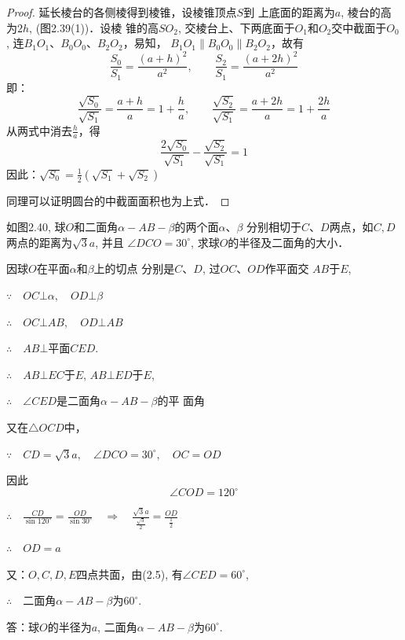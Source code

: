 \begin{proof}
    延长棱台的各侧棱得到棱锥，设棱锥顶点$S$到
    上底面的距离为$a$, 棱台的高为$2h$, (图2.39(1))．设棱
    锥的高$SO_2$, 交棱台上、下两底面于$O_1$和$O_2$交中截面于$O_0$,
    连$B_1O_1$、$B_0O_0$、$B_2O_2$，易知，
$B_1O_1\parallel B_0O_0\parallel B_2O_2$，故有
\[\frac{S_0}{S_1}=\frac{(a+h)^2}{a^2},\qquad \frac{S_2}{S_1}=\frac{(a+2h)^2}{a^2}\]
即：
\[\frac{\sqrt{S_0}}{\sqrt{S_1}}=\frac{a+h}{a}=1+\frac{h}{a},\qquad \frac{\sqrt{S_2}}{\sqrt{S_1}}=\frac{a+2h}{a}=1+\frac{2h}{a}\]
从两式中消去$\frac{h}{a}$，得
\[\frac{2\sqrt{S_0}}{\sqrt{S_1}}-\frac{\sqrt{S_2}}{\sqrt{S_1}}=1\]
因此：$\sqrt{S_0}=\frac{1}{2}\left(\sqrt{S_1}+\sqrt{S_2}\right)$

同理可以证明圆台的中截面面积也为上式．
\end{proof}


\begin{example}
    如图2.40, 球$O$和二面角$\alpha-AB-\beta$的两个面$\alpha$、$\beta$
分别相切于$C$、$D$两点，如$C,D$两点的距离为$\sqrt{3}a$, 并且
$\angle DCO=30^{\circ}$, 求球$O$的半径及二面角的大小．
\end{example}

\begin{solution}
    因球$O$在平面$\alpha$和$\beta$上的切点
分别是$C$、$D$, 过$OC$、$OD$作平面交
$AB$于$E$,

$\because\quad OC\bot\alpha,\quad OD\bot\beta$

$\therefore\quad OC\bot AB,\quad OD\bot AB$

$\therefore\quad AB\bot$平面$CED$.

$\therefore\quad AB\bot EC$于$E$, $AB\bot ED$于$E$,

$\therefore\quad \angle CED$是二面角$\alpha-AB-\beta$的平
面角

又在$\triangle OCD$中，

$\because\quad CD=\sqrt{3}a,\quad \angle DCO=30^{\circ},\quad 
OC=OD$

因此
\begin{equation}
    \angle COD=120^{\circ}
\end{equation}

$\therefore\quad \frac{CD}{\sin120^{\circ}}=\frac{OD}{\sin30^{\circ}}\quad \Rightarrow\quad \frac{\sqrt{3}a}{\frac{\sqrt{3}}{2}}=\frac{OD}{\frac{1}{2}}$

$\therefore\quad OD=a$

又：$O,C,D,E$四点共面，由(2.5), 有$\angle CED=60^{\circ}$,

$\therefore\quad $二面角$\alpha-AB-\beta$为$60^{\circ}$.

答：球$O$的半径为$a$, 二面角$\alpha-AB-\beta$为$60^{\circ}$.
\end{solution}


